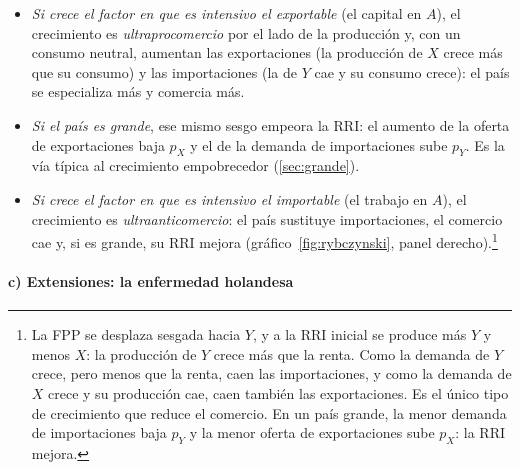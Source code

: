 \documentclass[11pt]{article}
\begin{document}
\begin{itemize}
\item \emph{Si crece el factor en que es intensivo el exportable} (el capital en $A$), el crecimiento es \emph{ultraprocomercio} por el lado de la producción y, con un consumo neutral, aumentan las exportaciones (la producción de $X$ crece más que su consumo) y las importaciones (la de $Y$ cae y su consumo crece): el país se especializa más y comercia más.
\item \emph{Si el país es grande}, ese mismo sesgo empeora la RRI: el aumento de la oferta de exportaciones baja $p_X$ y el de la demanda de importaciones sube $p_Y$. Es la vía típica al crecimiento empobrecedor (\ref{sec:grande}).
\item \emph{Si crece el factor en que es intensivo el importable} (el trabajo en $A$), el crecimiento es \emph{ultraanticomercio}: el país sustituye importaciones, el comercio cae y, si es grande, su RRI mejora (gráfico~\ref{fig:rybczynski}, panel derecho).\footnote{La FPP se desplaza sesgada hacia $Y$, y a la RRI inicial se produce más $Y$ y menos $X$: la producción de $Y$ crece más que la renta. Como la demanda de $Y$ crece, pero menos que la renta, caen las importaciones, y como la demanda de $X$ crece y su producción cae, caen también las exportaciones. Es el único tipo de crecimiento que reduce el comercio. En un país grande, la menor demanda de importaciones baja $p_Y$ y la menor oferta de exportaciones sube $p_X$: la RRI mejora.}
\end{itemize}

\paragraph{c) Extensiones: la enfermedad holandesa}
\end{document}
